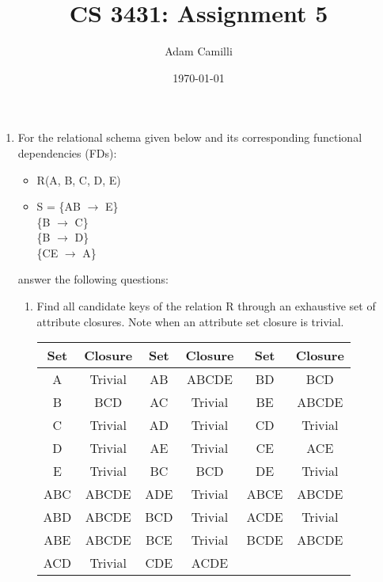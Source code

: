 \documentclass[12pt]{article}
\begin{document}
\title{CS 3431: Assignment 5}
\author{Adam Camilli}
\date{\today}

\maketitle

\begin{enumerate}
\item For the relational schema given below and its corresponding functional dependencies (FDs):
  \begin{itemize}
  \item R(A, B, C, D, E)
  \item S = \{AB $\to$ E\} \\ 
          \hspace*{0.7cm} \{B $\to$ C\} \\ 
          \hspace*{0.7cm} \{B $\to$ D\} \\ 
          \hspace*{0.7cm} \{CE $\to$ A\}
  \end{itemize}
  answer the following questions:
  \begin{enumerate}
  \item Find all candidate keys of the relation R through an exhaustive set of attribute closures. Note when an attribute set closure is trivial. \\ 
    \begin{tabular}[t]{|c|c||c|c||c|c|}
      \hline
      \textbf{Set} & \textbf{Closure} & \textbf{Set} & \textbf{Closure} & \textbf{Set} & \textbf{Closure} \\
      \hline
      A & Trivial & AB & ABCDE & BD & BCD \\
      \hline
      B & BCD & AC & Trivial & BE & ABCDE \\ 
      \hline
      C & Trivial & AD & Trivial & CD & Trivial \\
      \hline
      D & Trivial & AE & Trivial & CE & ACE \\
      \hline
      E & Trivial & BC & BCD & DE & Trivial \\
      \hline
      \hline
      ABC & ABCDE & ADE & Trivial & ABCE & ABCDE \\
      \hline
      ABD & ABCDE & BCD & Trivial & ACDE & Trivial\\
      \hline
      ABE & ABCDE & BCE & Trivial & BCDE & ABCDE\\
      \hline
      ACD & Trivial & CDE & ACDE & &\\

\end{tabular}
\end{enumerate}
\end{enumerate}
\end{document}
